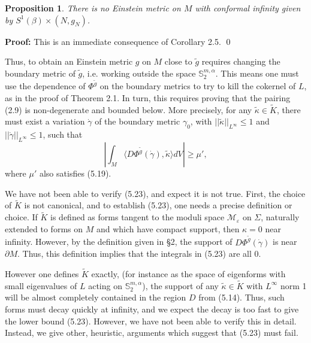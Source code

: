 \documentclass[11pt,amsfonts]{amsart}
\newtheorem{proposition}[theorem]{Proposition}
\def\endproof{\qed \medskip}
\begin{document}
\begin{proposition} \label{p 5.3.}
  There is no Einstein metric on $M$ with conformal infinity given by 
$S^{1}(\beta)\times (N, g_{N})$. 
\end{proposition}

\noindent
{\bf Proof:}
 This is an immediate consequence of Corollary 2.5.
{\endproof}

 Thus, to obtain an Einstein metric $g$ on $M$ close to $\widetilde g$ 
requires changing the boundary metric of $\widetilde g$, i.e. working 
outside the space ${\mathbb S}_{2}^{m,\alpha}$. This means one must use 
the dependence of $\Phi^{\widetilde g}$ on the boundary metrics to try 
to kill the cokernel of $L$, as in the proof of Theorem 2.1. In turn, this 
requires proving that the pairing (2.9) is non-degenerate and bounded below. 
More precisely, for any $\widetilde \kappa\in\widetilde K$, there must 
exist a variation $\dot \gamma$ of the boundary metric $\gamma_{0}$, with 
$||\widetilde \kappa||_{L^{\infty}} \leq 1$ and  
$||\dot \gamma||_{L^{\infty}} \leq 1$, such that 
\begin{equation} \label{e5.23}
|\int_{M}\langle D\Phi^{\widetilde g}(\dot \gamma), 
\widetilde \kappa \rangle dV| \geq  \mu' ,   
\end{equation}
 where $\mu'$ also satisfies (5.19). 

 We have not been able to verify (5.23), and expect it is not true. 
First, the choice of $\widetilde K$ is not canonical, and to establish 
(5.23), one needs a precise definition or choice. If $\widetilde K$ is defined 
as forms tangent to the moduli space ${\mathcal M}_{\varepsilon}$ on $\Sigma$, 
naturally extended to forms on $M$ and which have compact support, then 
$\kappa  = 0$ near infinity. However, by the definition given in \S 2, 
the support of $D\Phi^{\widetilde g}(\dot \gamma)$ is near 
$\partial M$. Thus, this definition implies that the integrals in 
(5.23) are all 0. 

 However one defines $\widetilde K$ exactly, (for instance as the space 
of eigenforms with small eigenvalues of $L$ acting on ${\mathbb 
S}_{2}^{m,\alpha}$), the support of any $\widetilde \kappa \in  
\widetilde K$ with $L^{\infty}$ norm 1 will be almost completely 
contained in the region $D$ from (5.14). Thus, such forms must decay 
quickly at infinity, and we expect the decay is too fast to give the 
lower bound (5.23). However, we have not been able to verify this in 
detail. Instead, we give other, heuristic, arguments which suggest that 
(5.23) must fail.
\end{document}
